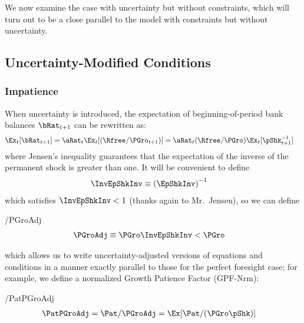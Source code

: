 \documentclass[BufferStockTheory]{subfiles}
\begin{document}
We now examine the case with uncertainty but without constraints, which will turn out to be a close parallel to the model with constraints but without uncertainty.

\hypertarget{Uncertainty-Modified-Conditions}{}
\subsection{Uncertainty-Modified Conditions}\label{subsec:UncertaintyModifiedConditions}
\subsubsection{Impatience}

When uncertainty is introduced, the expectation of beginning-of-period bank balances $\bRat_{t+1}$ can be rewritten as:
\begin{align}
  \Ex_{t}[\bRat_{t+1}]  & =  \aRat_{t}\Ex_{t}[(\Rfree/\PGro_{t+1})] = \aRat_{t}(\Rfree/\PGro)\Ex_{t}[\pShk_{t+1}^{-1}] \label{eq:EbRat}
\end{align}
where Jensen's inequality guarantees that the expectation of the inverse of the permanent shock is greater than one.  It will be convenient to define\hypertarget{InvEpShkInv}{}
\begin{align}
  \InvEpShkInv  & \equiv  {(\EpShkInv)}^{-1} \label{eq:InvEpShkInv}
\end{align}
which satisfies $\InvEpShkInv < 1$ (thanks again to Mr.\ Jensen), so we can define
\begin{verbatimwrite}{\EqDir/PGroAdj}
\begin{align}
      \PGroAdj & \equiv \PGro \InvEpShkInv < \PGro \label{eq:PGroAdj}
\end{align}
\end{verbatimwrite}

which allows us to write uncertainty-adjusted versions of equations and conditions in a manner exactly parallel to those for the perfect foresight case; for example, we define a normalized Growth Patience Factor (GPF-Nrm):
\hypertarget{GICNrm}{}\hypertarget{GICNrmI}{}\hypertarget{PermGroAdj}{}
\begin{verbatimwrite}{\EqDir/PatPGroAdj}
  \begin{align}
    \PatPGroAdj  & = \Pat/\PGroAdj = \Ex[\Pat/(\PGro\pShk)]  \label{eq:GPFNrm}
  \end{align}
\end{verbatimwrite}

\end{document}
